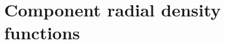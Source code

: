 \documentclass{article}
\begin{document}
  \clearpage
% 

  \section{Component radial density functions}\label{section:radial_density}
  
\end{document}
